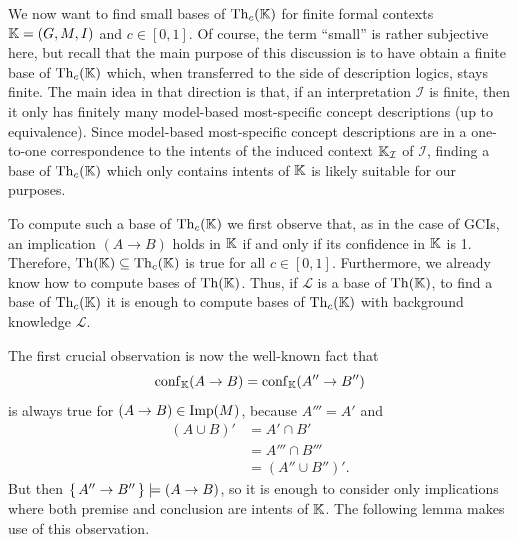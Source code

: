 We now want to find small bases of $\operatorname{Th}_c({\mathbb{K}})$ for finite formal contexts ${\mathbb{K}} =
(G, M, I)$ and $c \in [0,1]$.  Of course, the term ``small'' is rather subjective here,
but recall that the main purpose of this discussion is to have obtain a finite base of
$\operatorname{Th}_c({\mathbb{K}})$ which, when transferred to the side of description logics, stays finite.
The main idea in that direction is that, if an interpretation $\mathcal{I}$ is finite,
then it only has finitely many model-based most-specific concept descriptions (up to
equivalence).  Since model-based most-specific concept descriptions are in a one-to-one
correspondence to the intents of the induced context ${\mathbb{K}}_{\mathcal{I}}$ of
$\mathcal{I}$, finding a base of $\operatorname{Th}_c({\mathbb{K}})$ which only contains intents of ${\mathbb{K}}$
is likely suitable for our purposes.

To compute such a base of $\operatorname{Th}_c({\mathbb{K}})$ we first observe that, as in the case of GCIs,
an implication $(A \to B)$ holds in ${\mathbb{K}}$ if and only if its confidence in ${\mathbb{K}}$ is
1.  Therefore, $\operatorname{Th}({\mathbb{K}}) \subseteq \operatorname{Th}_c({\mathbb{K}})$ is true for all $c \in [0,1]$.
Furthermore, we already know how to compute bases of $\operatorname{Th}({\mathbb{K}})$.  Thus, if
$\mathcal{L}$ is a base of $\operatorname{Th}({\mathbb{K}})$, to find a base of $\operatorname{Th}_c({\mathbb{K}})$ it is enough
to compute bases of $\operatorname{Th}_c({\mathbb{K}})$ with background knowledge $\mathcal{L}$.

The first crucial observation is now the well-known fact that
\begin{equation*}
  \operatorname{conf}_{{\mathbb{K}}}(A \to B) = \operatorname{conf}_{{\mathbb{K}}}(A'' \to B'')
\end{equation*}
is always true for $(A \to B) \in \operatorname{Imp}(M)$, because $A''' = A'$ and
\begin{align*}
  (A \cup B)' &= A' \cap B' \\
  &= A''' \cap B'''\\
  &= (A'' \cup B'')'.
\end{align*}
But then ${\{\, A'' \to B'' \,\}} \models (A \to B)$, so it is enough to consider only
implications where both premise and conclusion are intents of ${\mathbb{K}}$.  The following
lemma makes use of this observation.

